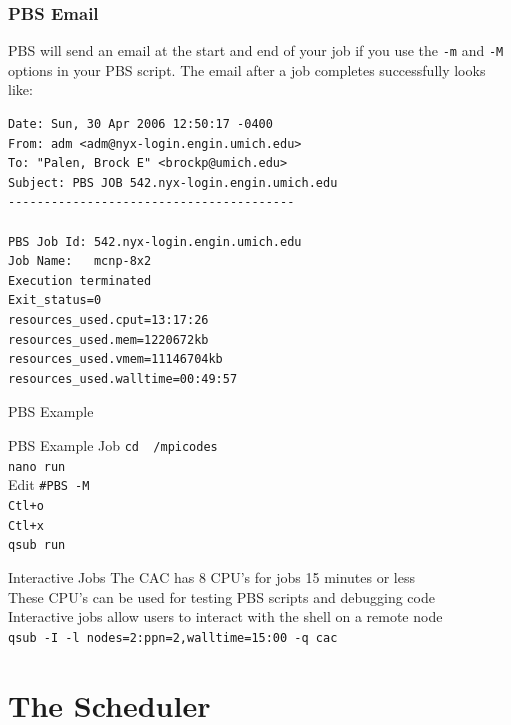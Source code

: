\documentclass{beamer}
\begin{document}
\begin{frame}[fragile]
 \frametitle{PBS Email}
PBS will send an email at the start and end of your job if you use the
\texttt{-m} and \texttt{-M} options in your PBS script.  The email after a job
completes successfully looks like:
\tiny
\begin{verbatim}
Date: Sun, 30 Apr 2006 12:50:17 -0400
From: adm <adm@nyx-login.engin.umich.edu>
To: "Palen, Brock E" <brockp@umich.edu>
Subject: PBS JOB 542.nyx-login.engin.umich.edu
----------------------------------------

PBS Job Id: 542.nyx-login.engin.umich.edu
Job Name:   mcnp-8x2
Execution terminated
Exit_status=0
resources_used.cput=13:17:26
resources_used.mem=1220672kb
resources_used.vmem=11146704kb
resources_used.walltime=00:49:57
\end{verbatim}
\normalsize
\end{frame}

\begin{frame}{PBS Example}
 \begin{block}{PBS Example Job}
  \texttt{cd ~/mpicodes}
  \\ \texttt{nano run}
  \\ Edit \texttt{\#PBS -M}
  \\ \texttt{Ctl+o}
  \\ \texttt{Ctl+x}
  \\ \texttt{qsub run}
 \end{block}
 \begin{block}{Interactive Jobs}
   {The CAC has 8 CPU's for jobs 15 minutes or less \\}
   {These CPU's can be used for testing PBS scripts and debugging code \\}
   {Interactive jobs allow users to interact with the shell on a remote node \\}
   {\texttt{qsub -I -l nodes=2:ppn=2,walltime=15:00 -q cac}}
 \end{block}
\end{frame}

\section{The Scheduler}
\end{document}
